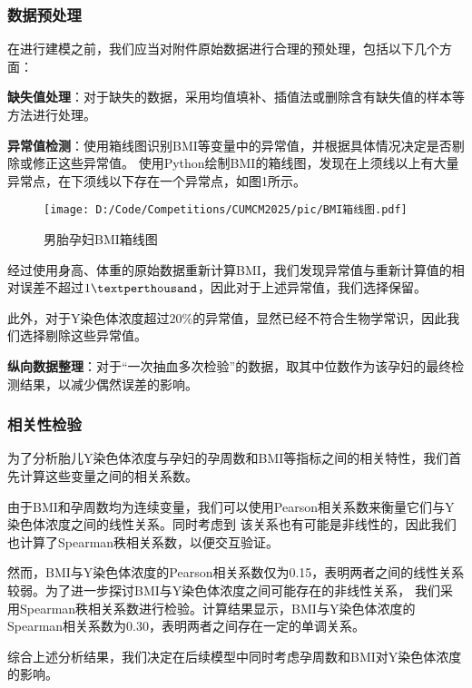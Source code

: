 \documentclass{cumcmthesis}
\begin{document}
            \subsubsection{数据预处理}
                在进行建模之前，我们应当对附件原始数据进行合理的预处理，包括以下几个方面：
                \par
                \textbf{缺失值处理}：对于缺失的数据，采用均值填补、插值法或删除含有缺失值的样本等方法进行处理。
                \par
                \textbf{异常值检测}：使用箱线图识别BMI等变量中的异常值，并根据具体情况决定是否剔除或修正这些异常值。
                使用Python绘制BMI的箱线图，发现在上须线以上有大量异常点，在下须线以下存在一个异常点，如图1所示。
                \begin{figure}[htbp]
                \centering
                \texttt{[image: D:/Code/Competitions/CUMCM2025/pic/BMI箱线图.pdf]}
                \caption{男胎孕妇BMI箱线图}
                \label{fi1}
                \end{figure}
                经过使用身高、体重的原始数据重新计算BMI，我们发现异常值与重新计算值的相对误差不超过$1\textperthousand$，因此对于上述异常值，我们选择保留。
                \par
                此外，对于Y染色体浓度超过$20\%$的异常值，显然已经不符合生物学常识，因此我们选择剔除这些异常值。
                \par
                \textbf{纵向数据整理}：对于“一次抽血多次检验”的数据，取其中位数作为该孕妇的最终检测结果，以减少偶然误差的影响。
                

            \subsubsection{相关性检验}
                为了分析胎儿Y染色体浓度与孕妇的孕周数和BMI等指标之间的相关特性，我们首先计算这些变量之间的相关系数。
                \par
                由于BMI和孕周数均为连续变量，我们可以使用Pearson相关系数来衡量它们与Y染色体浓度之间的线性关系。同时考虑到
                该关系也有可能是非线性的，因此我们也计算了Spearman秩相关系数，以便交互验证。
                
                \par
                然而，BMI与Y染色体浓度的Pearson相关系数仅为0.15，表明两者之间的线性关系较弱。为了进一步探讨BMI与Y染色体浓度之间可能存在的非线性关系，
                我们采用Spearman秩相关系数进行检验。计算结果显示，BMI与Y染色体浓度的Spearman相关系数为0.30，表明两者之间存在一定的单调关系。
                \par
                综合上述分析结果，我们决定在后续模型中同时考虑孕周数和BMI对Y染色体浓度的影响。
\end{document}
